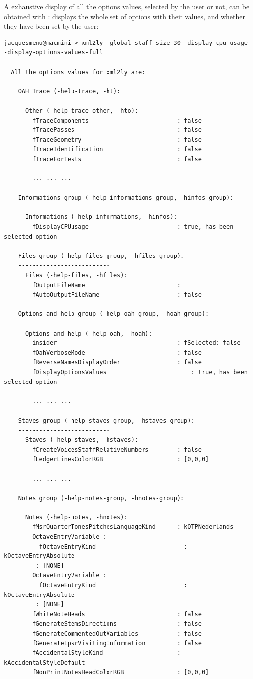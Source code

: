 A exhaustive display of all the options values, selected by the user or not, can be obtained with :
displays the whole set of options with their values, and whether they have been set by the user:
\begin{lstlisting}[language=Terminal]
jacquesmenu@macmini > xml2ly -global-staff-size 30 -display-cpu-usage -display-options-values-full

  All the options values for xml2ly are:

    OAH Trace (-help-trace, -ht):
    --------------------------
      Other (-help-trace-other, -hto):
        fTraceComponents                         : false
        fTracePasses                             : false
        fTraceGeometry                           : false
        fTraceIdentification                     : false
        fTraceForTests                           : false

		... ... ...

    Informations group (-help-informations-group, -hinfos-group):
    --------------------------
      Informations (-help-informations, -hinfos):
        fDisplayCPUusage                         : true, has been selected option

    Files group (-help-files-group, -hfiles-group):
    --------------------------
      Files (-help-files, -hfiles):
        fOutputFileName                          :
        fAutoOutputFileName                      : false

    Options and help group (-help-oah-group, -hoah-group):
    --------------------------
      Options and help (-help-oah, -hoah):
        insider                                  : fSelected: false
        fOahVerboseMode                          : false
        fReverseNamesDisplayOrder                : false
        fDisplayOptionsValues                        : true, has been selected option

		... ... ...

    Staves group (-help-staves-group, -hstaves-group):
    --------------------------
      Staves (-help-staves, -hstaves):
        fCreateVoicesStaffRelativeNumbers        : false
        fLedgerLinesColorRGB                     : [0,0,0]

		... ... ...

    Notes group (-help-notes-group, -hnotes-group):
    --------------------------
      Notes (-help-notes, -hnotes):
        fMsrQuarterTonesPitchesLanguageKind      : kQTPNederlands
        OctaveEntryVariable :
          fOctaveEntryKind                         : kOctaveEntryAbsolute
         : [NONE]
        OctaveEntryVariable :
          fOctaveEntryKind                         : kOctaveEntryAbsolute
         : [NONE]
        fWhiteNoteHeads                          : false
        fGenerateStemsDirections                 : false
        fGenerateCommentedOutVariables           : false
        fGenerateLpsrVisitingInformation         : false
        fAccidentalStyleKind                     : kAccidentalStyleDefault
        fNonPrintNotesHeadColorRGB               : [0,0,0]


\end{lstlisting}
